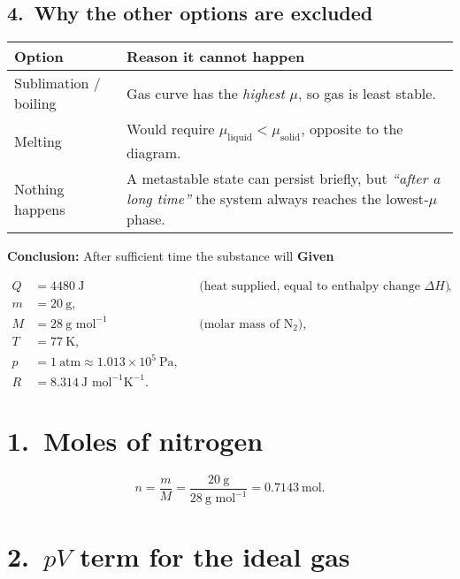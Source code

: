 \documentclass[12pt]{article}
\theoremstyle{definition} %
\theoremstyle{plain} %
\begin{document}
\subsection*{4.\ Why the other options are excluded}
\begin{center}
\begin{tabular}{@{}ll@{}}
\toprule
Option & Reason it cannot happen \\ \midrule
Sublimation / boiling &
  Gas curve has the \emph{highest} $\mu$, so gas is least stable. \\
Melting &
  Would require $\mu_{\text{liquid}} < \mu_{\text{solid}}$, opposite to
  the diagram. \\
Nothing happens &
  A metastable state can persist briefly, but \emph{``after a long
  time''} the system always reaches the lowest‑$\mu$ phase. \\ \bottomrule
\end{tabular}
\end{center}

\bigskip
\noindent
\textbf{Conclusion:}\; After sufficient time the substance will
\textbf{Given}

\[
\begin{aligned}
Q &= 4480\ \text{J} 
       &&\text{(heat supplied, equal to enthalpy change $\Delta H$)},\\
m &= 20\ \text{g}, \\
M &= 28\ \text{g mol}^{-1} 
       &&\text{(molar mass of N$_2$)},\\
T &= 77\ \text{K}, \\
p &= 1\ \text{atm}\approx 1.013\times10^{5}\ \text{Pa},\\
R &= 8.314\ \text{J mol}^{-1}\text{K}^{-1}.
\end{aligned}
\]

\section*{1.\ Moles of nitrogen}

\[
n = \frac{m}{M}
    = \frac{20\ \text{g}}{28\ \text{g mol}^{-1}}
    = 0.7143\ \text{mol}.
\]

\section*{2.\ $pV$ term for the ideal gas}
\end{document}
